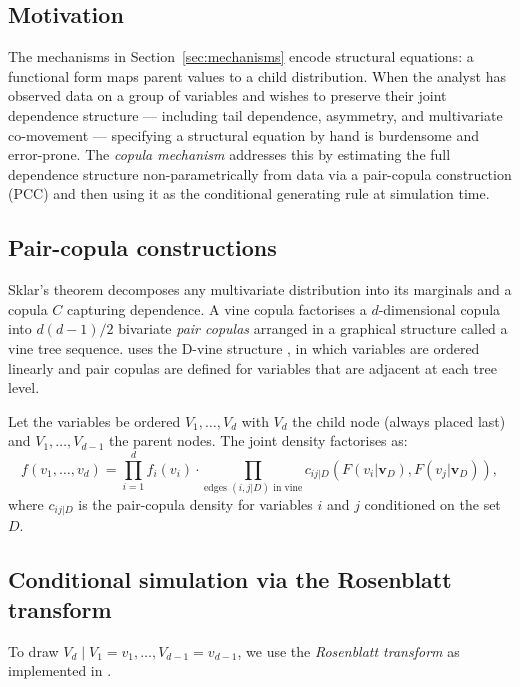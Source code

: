 \documentclass[article]{jss}
\begin{document}
\subsection{Motivation}

The mechanisms in Section~\ref{sec:mechanisms} encode structural equations: a functional form maps parent values to a child distribution. When the analyst has observed data on a group of variables and wishes to preserve their joint dependence structure --- including tail dependence, asymmetry, and multivariate co-movement --- specifying a structural equation by hand is burdensome and error-prone. The \emph{copula mechanism} addresses this by estimating the full dependence structure non-parametrically from data via a pair-copula construction (PCC) and then using it as the conditional generating rule at simulation time.

\subsection{Pair-copula constructions}

Sklar's theorem \citep{sklar1959fonctions} decomposes any multivariate distribution into its marginals and a copula $C$ capturing dependence. A vine copula \citep{joe1996families, bedford2002vines, aas2009pair} factorises a $d$-dimensional copula into $d(d-1)/2$ bivariate \emph{pair copulas} arranged in a graphical structure called a vine tree sequence.  uses the D-vine structure \citep{dissmann2013selecting}, in which variables are ordered linearly and pair copulas are defined for variables that are adjacent at each tree level.

Let the variables be ordered $V_1, \ldots, V_d$ with $V_d$ the child node (always placed last) and $V_1, \ldots, V_{d-1}$ the parent nodes. The joint density factorises as:
\[
f(v_1, \ldots, v_d) = \prod_{i=1}^d f_i(v_i) \cdot \prod_{\text{edges } (i,j|D) \text{ in vine}} c_{ij|D}(F(v_i|\mathbf{v}_D), F(v_j|\mathbf{v}_D)),
\]
where $c_{ij|D}$ is the pair-copula density for variables $i$ and $j$ conditioned on the set $D$.

\subsection{Conditional simulation via the Rosenblatt transform}

To draw $V_d \mid V_1 = v_1, \ldots, V_{d-1} = v_{d-1}$, we use the \emph{Rosenblatt transform} \citep{rosenblatt1952remarks} as implemented in  \citep{nagler2021rvinecopulib}.
\end{document}
